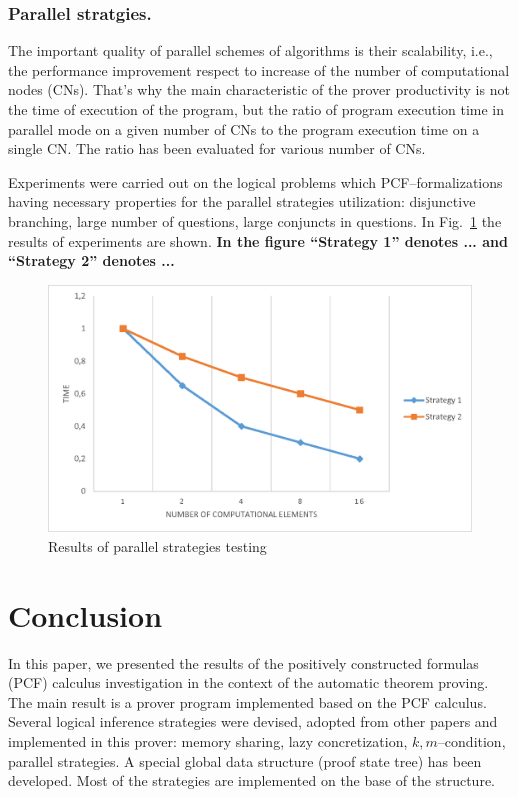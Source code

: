 \documentclass[runningheads,a4paper]{llncs}
\begin{document}
\subsubsection{Parallel stratgies.}
The important quality of parallel schemes of algorithms is their scalability, i.e., the performance improvement respect to increase of the number of computational nodes (CNs). That’s why the main characteristic of the prover productivity is not the time of execution of the program, but the ratio of program execution time in parallel mode on a given number of CNs to the program execution time on a single CN. The ratio has been evaluated for various number of CNs.

Experiments were carried out on the logical problems which PCF--for\-ma\-li\-za\-ti\-ons having necessary properties for the parallel strategies utilization: disjunctive branching, large number of questions, large conjuncts in questions. In Fig.~\ref{fig:parallel} the results of experiments are shown. \textbf{In the figure ``Strategy 1'' denotes ... and ``Strategy 2'' denotes ...}

\begin{figure}[h]
  \centering
  \includegraphics[width=0.8\linewidth]{img/Parallel.eps}
  \caption{Results of parallel strategies testing}
  \label{fig:parallel}
\end{figure}




\section*{Conclusion}
In this paper, we presented the results of the positively constructed formulas (PCF) calculus investigation in the context of the automatic theorem proving. The main result is a prover program implemented based on the PCF calculus. Several logical inference strategies were devised, adopted from other papers and implemented in this prover: memory sharing, lazy concretization, $k,m$--condition, parallel strategies. A special global data structure (proof state tree) has been developed. Most of the strategies are implemented on the base of the structure.
\end{document}
